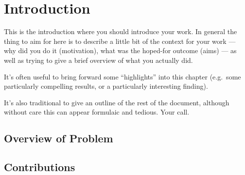 \chapter{Introduction}


\begin{guidance}
    This is the introduction where you should introduce your work.  In
    general the thing to aim for here is to describe a little bit of the
    context for your work --- why did you do it (motivation), what was the
    hoped-for outcome (aims) --- as well as trying to give a brief
    overview of what you actually did.

    It's often useful to bring forward some ``highlights'' into
    this chapter (e.g.\ some particularly compelling results, or
    a particularly interesting finding).

    It's also traditional to give an outline of the rest of the
    document, although without care this can appear formulaic
    and tedious. Your call.
\end{guidance}

%

\section{Overview of Problem}

\section{Contributions}
